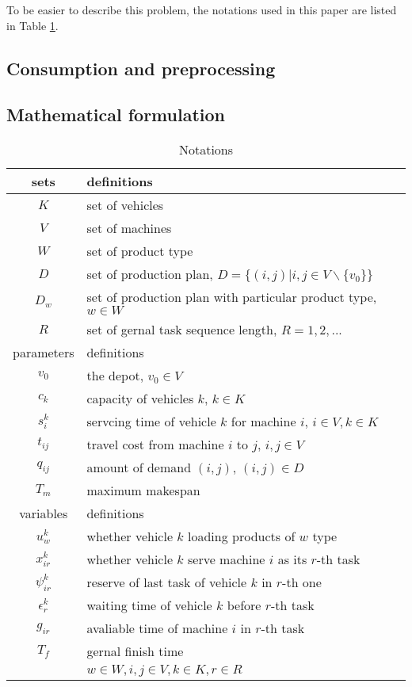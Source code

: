 \documentclass[preprint,12pt,authoryear]{elsarticle}
\begin{document}
To be easier to describe this problem, the notations used in this paper are listed in Table \ref{tab1}.

\subsection{Consumption and preprocessing}

\subsection{Mathematical formulation}

\begin{longtable}{cl}%
    \caption{Notations}\label{tab1}\\
    \toprule [2pt] %
    sets& definitions \\
    \midrule [1pt]  
    $K$& set of vehicles \\
    $V$& set of machines \\
    $W$& set of product type \\
    $D$& set of   production plan,
    $D=\{(i,j)|i,j\in V\backslash \{v_0\}\}$\\
    $D_w$& set of production plan with particular product type, $w \in W$ \\
    $R$& set of gernal task sequence length, $R={1,2,...}$ \\
    \midrule [1pt]     
    parameters & definitions  \\ %
    \midrule [1pt]
    $v_0$& the depot, $v_0\in V$ \\
    $c_k$& capacity of vehicles $k$, $k\in K$ \\
    $s_i^k$& servcing time of vehicle $k$ for machine $i$, $i\in V,k\in K$ \\
    $t_{ij}$& travel cost from machine $i$ to $j$, $i,j\in V$ \\ 
    $q_{ij}$& amount of demand $(i,j)$, $(i,j)\in D$ \\
    $T_m$& maximum makespan \\
    \midrule[1pt]
    variables & definitions \\
    \midrule[1pt]
    $u_w^k$& whether vehicle $k$ loading products of $w$ type \\
    $x_{ir}^k$& whether vehicle $k$ serve machine $i$ as its $r$-th task \\
    $\psi_{ir}^k$& reserve of last task of vehicle $k$ in $r$-th one \\
    $\epsilon_r^k$& waiting time of vehicle $k$ before $r$-th task \\
    $g_{ir}$& avaliable time of machine $i$ in $r$-th task \\
    $T_f$& gernal finish time \\
    & $w\in W,i,j\in V,k\in K,r\in R$\\
    \bottomrule [2pt]
\end{longtable}
\end{document}
